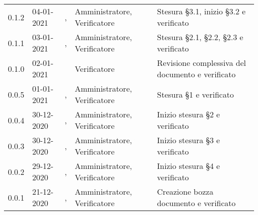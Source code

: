 {\begin{longtable}{C{1.7cm} | C{2.5cm} | C{3.2cm} | C{2.9cm} | C{4.6cm}}
0.1.2 & 04-01-2021 & \ZM{}, \BM{} & Amministratore, Verificatore & Stesura \S 3.1, inizio \S 3.2 e verificato\\
0.1.1 & 03-01-2021 & \PA{}, \SP{} & Amministratore, Verificatore & Stesura \S 2.1, \S 2.2, \S 2.3 e verificato\\
0.1.0 & 02-01-2021 & \BM{} & Verificatore & Revisione complessiva del documento e verificato\\
0.0.5 & 01-01-2021 & \ZM{}, \SP{} & Amministratore, Verificatore & Stesura \S 1 e verificato\\
0.0.4 & 30-12-2020 & \PA{}, \SP{} & Amministratore, Verificatore & Inizio stesura \S 2 e verificato\\
0.0.3 & 30-12-2020 & \ZM{}, \BM{} & Amministratore, Verificatore & Inizio stesura \S 3 e verificato\\
0.0.2 & 29-12-2020 & \RA{}, \SP{} & Amministratore, Verificatore & Inizio stesura \S 4 e verificato\\
0.0.1 & 21-12-2020 & \ZM{}, \BM{} & Amministratore, Verificatore & Creazione bozza documento e verificato\\	
\end{longtable}
}
